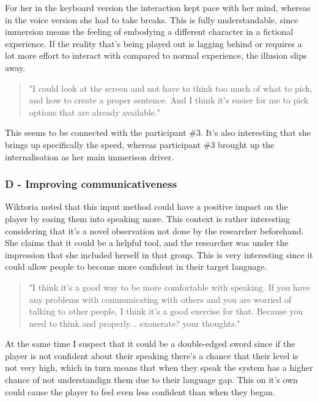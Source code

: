 For her in the keyboard version the interaction kept pace with her mind, whereas in the voice version she had to take breaks. This is fully understandable, since immersion means the feeling of embodying a different character in a fictional experience. If the reality that's being played out is lagging behind or requires a lot more effort to interact with compared to normal experience, the illusion slips away. 

\begin{quote}
    "I could look at the screen and not have to think too much of what to pick, and how to create a proper sentence. And I think it's easier for me to pick options that are already available."
\end{quote}

This seems to be connected with the participant \#3. It's also interesting that she brings up specifically the speed, whereas participant \#3 brought up the internalisation as her main immerison driver.


\subsubsection{D - Improving communicativeness}

Wiktoria noted that this input method could have a positive impact on the player by easing them into speaking more. This context is rather interesting considering that it's a novel observation not done by the researcher beforehand. She claims that it could be a helpful tool, and the researcher was under the impression that she included herself in that group. This is very interesting since it could allow people to become more confident in their target language. 

\begin{quote}
    "I think it's a good way to be more comfortable with speaking. If you have any problems with communicating with others and you are worried of talking to other people, I think it's a good exercise for that. Because you need to think and properly... exonerate? your thoughts."
\end{quote}
At the same time I suspect that it could be a double-edged sword since if the player is not confident about their speaking there's a chance that their level is not very high, which in turn means that when they speak the system has a higher chance of not understandign them due to their language gap. This on it's own could cause the player to feel even less confident than when they began.


